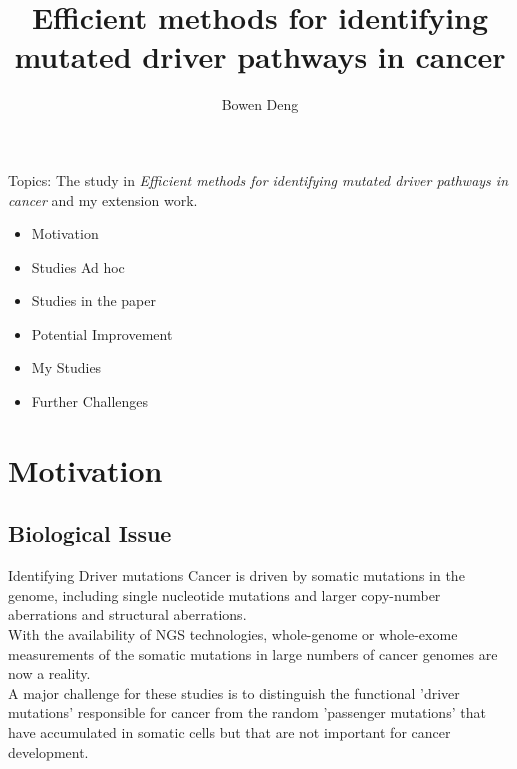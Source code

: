 \documentclass[xcolor=dvipsnames]{beamer}
\begin{document}
\title{Efficient methods for identifying mutated driver pathways in cancer}
\author{Bowen Deng}
\date{}
\begin{frame}
\maketitle
\end{frame}
\begin{frame}
Topics: The study in {\em Efficient methods for identifying mutated driver pathways in cancer} and my extension work.\\
\begin{itemize}
\item Motivation\\
\item Studies Ad hoc\\
\item Studies in the paper\\
\item Potential Improvement\\
\item My Studies\\
\item Further Challenges
\end{itemize}
\end{frame}
\section{Motivation}
\subsection{Biological Issue}
\begin{frame}{Identifying Driver mutations}
Cancer is driven by somatic mutations in the genome, including single nucleotide mutations and larger copy-number aberrations and structural aberrations.\\
With the availability of NGS technologies, whole-genome or whole-exome measurements of the somatic mutations in large numbers of cancer genomes are now a reality.\\
A major challenge for these studies is to distinguish the functional 'driver mutations' responsible for cancer from the random 'passenger mutations' that have accumulated in somatic cells but that are not important for cancer development.\\
\end{frame}
\end{document}
